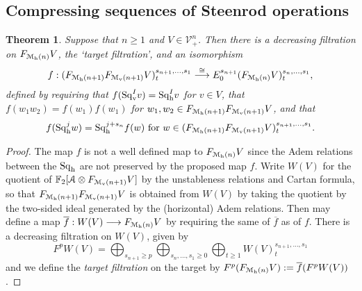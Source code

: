 \documentclass[11pt]{amsart}
\theoremstyle{plain}
\newtheorem{thm}{Theorem}[section]
\theoremstyle{definition}
\renewcommand{\to}{\longrightarrow}
\newcommand{\calA}{\mathcal{A}}
\newcommand{\calV}{\mathcal{V}}
\newcommand{\calM}{\mathcal{M}}
\theoremstyle{plain}
\newcommand{\vect}[2]{\calV^{#1}_{#2}}
\newcommand{\Sq}{\mathrm{Sq}}
\newcommand{\LieSteen}{\calA}
\newcommand{\F}{\mathbb{F}}
\begin{document}
\begin{Cohomology operations for all unstable Lie algebras}
\subsection{Compressing sequences of Steenrod operations}
\begin{thm}\label{thm on compressing seqs of steenrod ops}
Suppose that $n\geq1$ and $V\in \vect{n}{+}$. Then there is a decreasing filtration on $F_{\calM_\textup{h}(n)}V$, the `target filtration', and an isomorphism
\[ f:(F_{\calM_\textup{h}(n+1)}F_{\calM_\textup{v}(n+1)}V)^{s_{n+1},\ldots,s_1}_t\overset{\cong}{\to} E_0^{s_{n+1}}(F_{\calM_\textup{h}(n)}V)^{s_n,\ldots,s_1}_t,\]
defined by requiring that
$f(\Sq_\textup{v}^Iv)=\Sq_\textup{h}^Iv$ for $v\in V$, that $f(w_1w_2)=f(w_1)f(w_1)$ for $w_1,w_2\in F_{\calM_\textup{h}(n+1)}F_{\calM_\textup{v}(n+1)}V$,
and that
\[f(\Sq_\textup{h}^jw)=\Sq_\textup{h}^{j+s_n}f(w)\textup{ for }w\in (F_{\calM_\textup{h}(n+1)}F_{\calM_\textup{v}(n+1)}V)^{s_{n+1},\ldots,s_1}_t.\]
\end{thm}
\begin{proof}
The map $f$ is not a well defined map to $F_{\calM_\textup{h}(n)}V$ since the Adem relations between the $\Sq_\textup{h}$ are not preserved by the proposed map $f$. Write $W(V)$ for the quotient of $\F_2[\LieSteen\otimes F_{\calM_\textup{v}(n+1)}V]$ by the unstableness relations and Cartan formula, so that $F_{\calM_\textup{h}(n+1)}F_{\calM_\textup{v}(n+1)}V$ is obtained from $W(V)$ by taking the quotient by the two-sided ideal generated by the (horizontal) Adem relations. Then may define a map $\overline{f}:W(V)\to F_{\calM_\textup{h}(n)}V$ by requiring the same of $\overline{f}$ as of $f$. There is a decreasing filtration on $W(V)$, given by 
\[F^pW(V)=\bigoplus_{s_{n+1}\geq p}\bigoplus_{s_n,\ldots,s_1\geq0}\bigoplus_{t\geq1}W(V)^{s_{n+1},\ldots,s_1}_t\]
 and we define the \emph{target filtration} on the target by $F^p(F_{\calM_\textup{h}(n)}V):=\overline{f}(F^pW(V))$.


\end{proof}
\end{Cohomology operations for all unstable Lie algebras}
\end{document}
